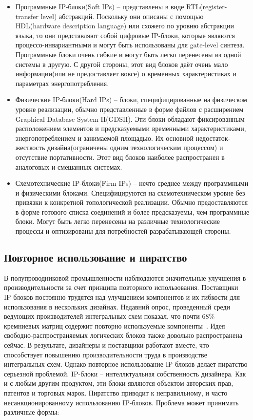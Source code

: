 \begin{itemize}
  \item Программные IP-блоки(Soft IPs) -- представлены в виде RTL(register-transfer level) абстракций. Поскольку они описаны с помощью HDL(hardware description language) или схожего по уровню абстракции языка, то они представляют собой цифровые IP-блоки, которые являются процессо-инвариантными и могут быть использованы для gate-level синтеза. Программные блоки очень гибкие и могут быть легко перенесены из одной системы в другую. С другой стороны, этот вид блоков даёт очень мало информации(или не предоставляет вовсе) о временных характеристиках и параметрах энергопотребления.
  \item Физические IP-блоки(Hard IPs) -- блоки, специфицированные на физическом уровне реализации, обычно представленные в форме файлов с расширением Graphical Database System II(GDSII). Эти блоки обладают фиксированным расположением элементов и предсказуемыми временными характеристиками, энергопотреблением и занимаемой площадью. Их основной недостаток- жесткость дизайна(ограничены одним технологическим процессом) и отсутствие портативности. Этот вид блоков наиболее распространен в аналоговых и смешанных системах.
  \item Схемотехнические IP-блоки(Firm IPs) -- нечто среднее между программными и физическими блоками. Специфицируются на схемотехническом уровне без привязки к конкретной топологической реализации. Обычно предоставляются в форме готового списка соединений и более предсказуемы, чем программные блоки. Могут быть легко перенесены на различные технологические процессы и оптизированы для потребностей разрабатывающей стороны.
\end{itemize}


\subsection{Повторное использование и пиратство}
\label{page:domain:piracy}
В полупроводниковой промышленности наблюдаются значительные улучшения в производительности за счет принципа повторного использования. Поставщики IP-блоков постоянно трудятся над улучшением компонентов и их гибкости для использования в нескольких дизайнах. Недавний опрос, проведенный среди ведующих производителей интегральных схем показал, что почти 68\% кремниевых матриц содержит повторно используемые компоненты~\cite{design_and_verification_report_2013}. Идея свободно-распространяемых логических блоков также довольно распространена сейчас. В результате, дизайнеры и поставщики работают вместе, что способствует повышению производительности труда в производстве интегральных схем. Однако повторное использование IP-блоков делает пиратство серьезной проблемой. IP-блоки -- интеллктуальная собственность дизайнера. Как и с любым другим продуктом, эти блоки являются объектом авторских прав, патентов и торговых марок. Пиратство приводит к неправильному, и часто несанкционированному использованию IP-блоков. Проблема может принимать различные формы:

